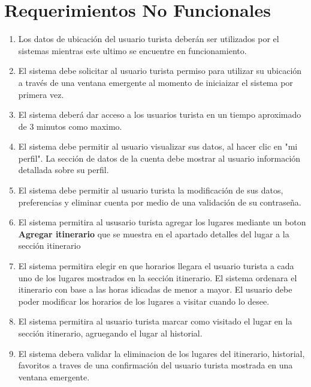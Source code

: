 \documentclass{article}
\begin{document}
\section{Requerimientos No Funcionales}
\begin{enumerate}
    \item Los datos de ubicación del usuario turista deberán ser utilizados por el sistemas mientras este ultimo se encuentre en funcionamiento.
    
    \item El sistema debe solicitar al usuario turista permiso para utilizar su ubicación a través de una ventana emergente al momento de iniciaizar el sistema por primera vez.
    
    \item El sistema deberá dar acceso a los usuarios turista en un tiempo aproximado de 3 minutos como maximo.

    \item El sistema debe permitir al usuario visualizar sus datos, al hacer clic en "mi perfil". La sección de datos
    de la cuenta debe mostrar al usuario información detallada sobre su perfil.
    
    \item El sistema debe permitir al usuario turista la modificación de sus datos, preferencias y eliminar cuenta por medio de una validación de su contraseña. 
    
    \item El sistema permitira al ususario turista agregar los lugares mediante un boton \textbf{Agregar itinerario} que se muestra en el apartado detalles del lugar a la sección itinerario
    
    \item El sistema permitira elegir en que horarios llegara el usuario turista a cada uno de los lugares mostrados en la sección itinerario. El sistema ordenara el itinerario con base a las horas idicadas de menor a mayor. El usuario debe poder modificar los horarios de los lugares a visitar cuando lo desee.
    
    \item El sistema permitira al usuario turista marcar como visitado el lugar en la sección itinerario, agruegando el lugar al historial.
    
    \item  El sistema debera validar la eliminacion de los lugares del itinerario, historial, favoritos a traves de una confirmación del usuario turista mostrada en una ventana emergente.
    

\end{enumerate}
\end{document}

